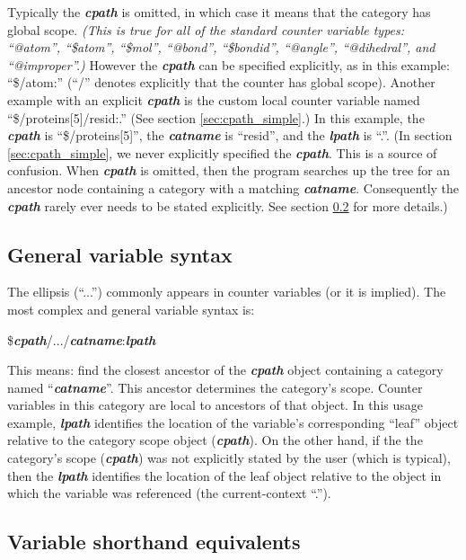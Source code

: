 \documentclass[11pt]{article}
\begin{document}
Typically the \textit{\textbf{cpath}} is omitted, 
in which case it means that the category has global scope. 
\textit{(This is true for all of the standard counter variable types:
``@atom'', ``\$atom'', ``\$mol'',
``@bond'', ``\$bondid'',
``@angle'',
``@dihedral'', and
``@improper''.)}
However the \textit{\textbf{cpath}} can be specified 
explicitly, as in this example: ``\$/atom:''
(``/'' denotes explicitly that the counter has global scope).
Another example with an explicit \textit{\textbf{cpath}} is
the custom local counter variable named ``\$/proteins[5]/resid:.'' 
(See section \ref{sec:cpath_simple}.)
In this example, the \textit{\textbf{cpath}} is ``\$/proteins[5]'', the 
\textit{\textbf{catname}} is ``resid'', 
and the \textit{\textbf{lpath}} is ``.''.
(In section 
\ref{sec:cpath_simple}, 
we never explicitly specified the \textit{\textbf{cpath}}. 
This is a source of confusion.
When \textit{\textbf{cpath}} is omitted,
then the program searches up the tree for an ancestor node
containing a category with a matching \textit{\textbf{catname}}.  Consequently
the \textit{\textbf{cpath}} rarely ever needs to be stated explicitly.
See section \ref{sec:variables_shorthand} for more details.)



\subsection{General variable syntax}
The ellipsis (``...'') commonly appears in counter variables 
(or it is implied).  The most complex and general variable syntax is:

\$\textit{\textbf{cpath}}/.../\textit{\textbf{catname}}:\textit{\textbf{lpath}}

This means: find the closest ancestor of the \textit{\textbf{cpath}} object containing a category named ``\textit{\textbf{catname}}''.  This ancestor determines the category's scope.  Counter variables in this category are local to ancestors of that object.  In this usage example, \textit{\textbf{lpath}} identifies the location of the variable's corresponding ``leaf'' object
relative to the category scope object (\textit{\textbf{cpath}}).  
On the other hand, if the the category's scope (\textit{\textbf{cpath}})
was not explicitly stated by the user (which is typical), 
then the \textit{\textbf{lpath}} identifies the location of the leaf object relative to 
the object in which the variable was referenced 
(the current-context ``.'').

\subsection{Variable shorthand equivalents}
\label{sec:variables_shorthand}
\end{document}
